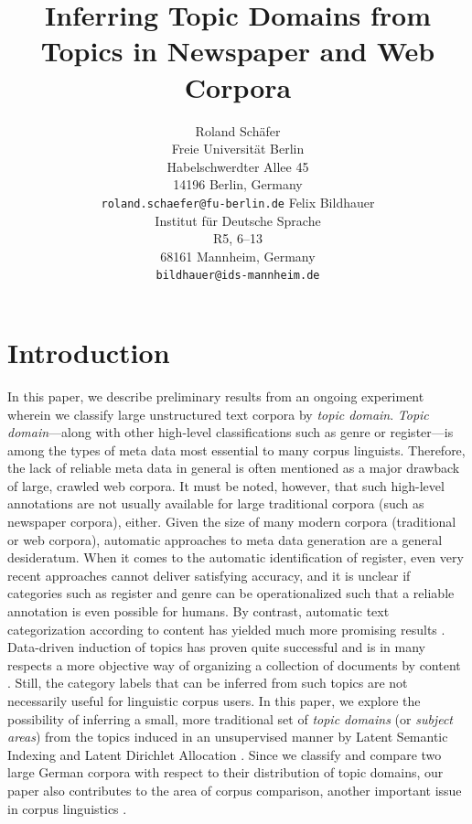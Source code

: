 \documentclass[11pt]{article}
\title{Inferring Topic Domains from Topics in Newspaper and Web Corpora}
\author{Roland Schäfer\\
	    Freie Universität Berlin\\
	    Habelschwerdter Allee 45\\
	    14196 Berlin, Germany\\
	    {\tt roland.schaefer@fu-berlin.de}
	  \And
	Felix Bildhauer\\
  	Institut für Deutsche Sprache\\
  	R5, 6--13\\
  	68161 Mannheim, Germany\\
  {\tt bildhauer@ids-mannheim.de}}
\date{}
\begin{document}
\maketitle


\section{Introduction}
\label{sec:introduction}

In this paper, we describe preliminary results from an ongoing experiment wherein we classify large unstructured text corpora by \textit{topic domain}.
\textit{Topic domain}---along with other high-level classifications such as genre or register---is among the types of meta data most essential to many corpus linguists.
Therefore, the lack of reliable meta data in general is often mentioned as a major drawback of large, crawled web corpora.
It must be noted, however, that such high-level annotations are not usually available for large traditional corpora (such as newspaper corpora), either.
Given the size of many modern corpora (traditional or web corpora), automatic approaches to meta data generation are a general desideratum.
When it comes to the automatic identification of register, even very recent approaches \cite{BiberEgbert2016} cannot deliver satisfying accuracy, and it is unclear if categories such as register and genre can be operationalized such that a reliable annotation is even possible for humans.
By contrast, automatic text categorization according to content has yielded much more promising results \cite{Sebastiani2002}.
Data-driven induction of topics has proven quite successful and is in many respects a more objective way of organizing a collection of documents by content \cite{Eagles1996}.
Still, the category labels that can be inferred from such topics are not necessarily useful for linguistic corpus users.
In this paper, we explore the possibility of inferring a small, more traditional set of \textit{topic domains} (or \textit{subject areas}) from the topics induced in an unsupervised manner by Latent Semantic Indexing \cite{LandauerDumais1994,LandauerDumais1997} and Latent Dirichlet Allocation \cite{BleiEa2003}.
Since we classify and compare two large German corpora with respect to their distribution of topic domains, our paper also contributes to the area of corpus comparison, another important issue in corpus linguistics \cite{Kilgarriff2001,BiemannEa2013}.
\end{document}

